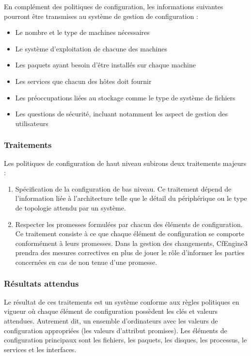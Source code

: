 En complément des politiques de configuration, les informations suivantes
pourront être transmises au système de gestion de configuration :

\begin{itemize}
    \item Le nombre et le type de machines nécessaires
    \item Le système d'exploitation de chacune des machines
    \item Les paquets ayant besoin d'être installés sur chaque machine
    \item Les services que chacun des hôtes doit fournir
    \item Les préoccupations liées au stockage comme le type de système de
        fichiers
    \item Les questions de sécurité, incluant notamment les aspect de gestion
        des utilisateurs
\end{itemize}

\subsubsection{Traitements}

Les politiques de configuration de haut niveau subirons deux traitements majeurs
:

\begin{enumerate}
    \item Spécification de la configuration de bas niveau. Ce traitement dépend
        de l'information liée à l'architecture telle que le détail du
        périphérique ou le type de topologie attendu par un système.
    \item Respecter les promesses formulées par chacun des éléments de
        configuration. Ce traitement consiste à ce que chaque élément de
        configuration se comporte conformément à leurs promesses. Dans la
        gestion des changements, CfEngine3 prendra des mesures correctives en
        plus de jouer le rôle d'informer les parties concernées en cas de non
        tenue d'une promesse.
\end{enumerate}

\subsubsection{Résultats attendus}

Le résultat de ces traitements est un système conforme aux règles politiques en
vigueur où chaque élément de configuration possèdent les clés et valeurs
attendues.  Autrement dit, un ensemble d'ordinateurs avec les valeurs de
configuration appropriées (les valeurs d'attribut promises).  Les éléments de
configuration principaux sont les fichiers, les paquets, les disques, les
processus, le services et les interfaces. 

